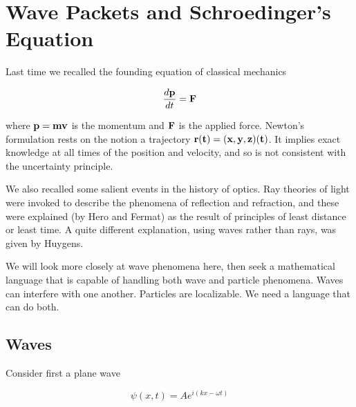 
\begin{mathmacro}
\newcommand{\bop}[0]{\bf{p}}
\newcommand{\boF}[0]{\bf{F}}
\newcommand{\bor}[0]{\bf{r}}
\newcommand{\bov}[0]{\bf{v}}
\end{mathmacro}

\setcounter{section}{3}



\section{Wave Packets and Schroedinger's Equation}




Last time we recalled the founding equation of classical mechanics

\begin{equation}
\frac{d \bf{p} }{dt} = \boF
\end{equation}

where $\bop = m\bov $ is the momentum and $\boF $  is the applied force.  Newton's formulation rests on the notion a trajectory $\bor(t) = (x,y,z)(t)$.  It implies exact knowledge at all times of the position and velocity, and so is not consistent with the uncertainty principle.

We also recalled some salient events in the history of optics. Ray theories of light were invoked to describe the phenomena of reflection and refraction, and these were explained (by Hero and Fermat) as the result of principles of least distance or least time.  A quite different explanation, using waves rather than rays, was given by Huygens.

We will look more closely at wave phenomena here, then seek a mathematical language that is capable of handling both wave and particle phenomena.  Waves can interfere with one another.  Particles are localizable. We need a language that can do both.

\subsection{Waves}

Consider first a plane wave

\begin{equation}
\label{planewave}
\psi(x,t) = Ae^{i(kx - \omega t)}
\end{equation}

